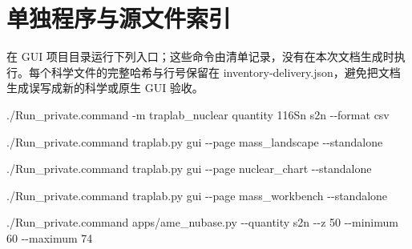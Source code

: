 \documentclass[
  11pt,
  letterpaper,
]{article}
\newenvironment{Shaded}{}{}
\newcommand{\AttributeTok}[1]{\textcolor[rgb]{0.49,0.56,0.16}{#1}}
\newcommand{\ExtensionTok}[1]{#1}
\newcommand{\NormalTok}[1]{#1}
\begin{document}
\section{单独程序与源文件索引}\label{ux5355ux72ecux7a0bux5e8fux4e0eux6e90ux6587ux4ef6ux7d22ux5f15}

在 GUI
项目目录运行下列入口；这些命令由清单记录，没有在本次文档生成时执行。每个科学文件的完整哈希与行号保留在
inventory-delivery.json，避免把文档生成误写成新的科学或原生 GUI 验收。

\begin{Shaded}
\begin{Highlighting}[]
\ExtensionTok{./Run\_private.command} \AttributeTok{{-}m}\NormalTok{ traplab\_nuclear quantity 116Sn s2n }\AttributeTok{{-}{-}format}\NormalTok{ csv}
\end{Highlighting}
\end{Shaded}

\begin{Shaded}
\begin{Highlighting}[]
\ExtensionTok{./Run\_private.command}\NormalTok{ traplab.py gui }\AttributeTok{{-}{-}page}\NormalTok{ mass\_landscape }\AttributeTok{{-}{-}standalone}
\end{Highlighting}
\end{Shaded}

\begin{Shaded}
\begin{Highlighting}[]
\ExtensionTok{./Run\_private.command}\NormalTok{ traplab.py gui }\AttributeTok{{-}{-}page}\NormalTok{ nuclear\_chart }\AttributeTok{{-}{-}standalone}
\end{Highlighting}
\end{Shaded}

\begin{Shaded}
\begin{Highlighting}[]
\ExtensionTok{./Run\_private.command}\NormalTok{ traplab.py gui }\AttributeTok{{-}{-}page}\NormalTok{ mass\_workbench }\AttributeTok{{-}{-}standalone}
\end{Highlighting}
\end{Shaded}

\begin{Shaded}
\begin{Highlighting}[]
\ExtensionTok{./Run\_private.command}\NormalTok{ apps/ame\_nubase.py }\AttributeTok{{-}{-}quantity}\NormalTok{ s2n }\AttributeTok{{-}{-}z}\NormalTok{ 50 }\AttributeTok{{-}{-}minimum}\NormalTok{ 60 }\AttributeTok{{-}{-}maximum}\NormalTok{ 74}
\end{Highlighting}
\end{Shaded}
\end{document}
